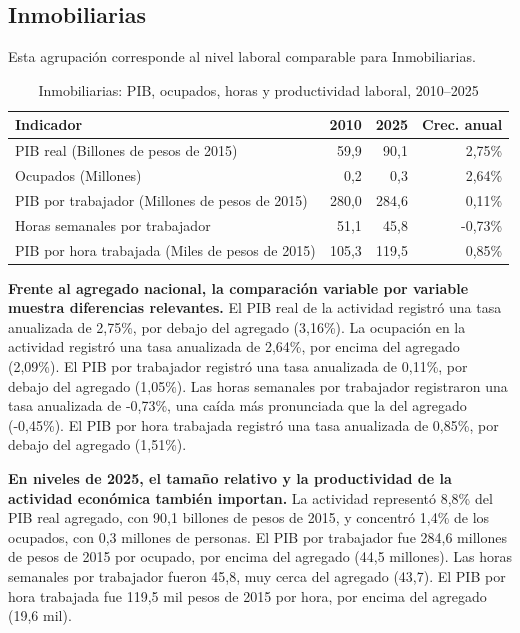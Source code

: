 \subsection{Inmobiliarias}

Esta agrupación corresponde al nivel laboral comparable para Inmobiliarias.

\begin{table}[H]
\centering
\caption{Inmobiliarias: PIB, ocupados, horas y productividad laboral, 2010--2025}
\label{tab:agg25_l_productividad}
\small
\begin{tabular}{lrrr}
\toprule
Indicador & 2010 & 2025 & Crec. anual \\
\midrule
PIB real  (Billones de pesos de 2015) & 59,9 & 90,1 & 2,75\% \\
Ocupados (Millones) & 0,2 & 0,3 & 2,64\% \\
PIB por trabajador (Millones de pesos de 2015) & 280,0 & 284,6 & 0,11\% \\
Horas semanales por trabajador & 51,1 & 45,8 & -0,73\% \\
PIB por hora trabajada (Miles de pesos de 2015) & 105,3 & 119,5 & 0,85\% \\
\bottomrule
\end{tabular}
\end{table}

\textbf{Frente al agregado nacional, la comparación variable por variable muestra diferencias relevantes.} El PIB real de la actividad registró una tasa anualizada de 2,75\%, por debajo del agregado (3,16\%). La ocupación en la actividad registró una tasa anualizada de 2,64\%, por encima del agregado (2,09\%). El PIB por trabajador registró una tasa anualizada de 0,11\%, por debajo del agregado (1,05\%). Las horas semanales por trabajador registraron una tasa anualizada de -0,73\%, una caída más pronunciada que la del agregado (-0,45\%). El PIB por hora trabajada registró una tasa anualizada de 0,85\%, por debajo del agregado (1,51\%).

\textbf{En niveles de 2025, el tamaño relativo y la productividad de la actividad económica también importan.} La actividad representó 8,8\% del PIB real agregado, con 90,1 billones de pesos de 2015, y concentró 1,4\% de los ocupados, con 0,3 millones de personas. El PIB por trabajador fue 284,6 millones de pesos de 2015 por ocupado, por encima del agregado (44,5 millones). Las horas semanales por trabajador fueron 45,8, muy cerca del agregado (43,7). El PIB por hora trabajada fue 119,5 mil pesos de 2015 por hora, por encima del agregado (19,6 mil).

